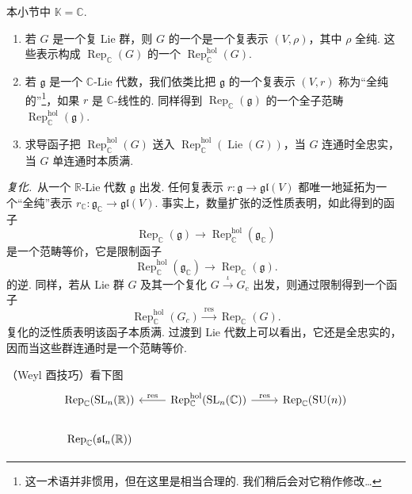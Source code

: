 \begin{numpara}\label{np:lie-1-12-3}
本小节中 $\mathbb K=\mathbb C$.
\begin{enumerate}[label=\roman*)]
\item 若 $G$ 是一个复 Lie 群，则 $G$ 的一个是一个复表示 $(V,\rho)$，其中 $\rho$ 全纯. 这些表示构成 $\operatorname{Rep}_{\mathbb C}(G)$ 的一个 $\operatorname{Rep}^{\mathrm{hol}}_{\mathbb C}(G)$.
\item 若 $\mathfrak g$ 是一个 $\mathbb C$-Lie 代数，我们依类比把 $\mathfrak g$ 的一个复表示 $(V,r)$ 称为``全纯的''\footnote{这一术语并非惯用，但在这里是相当合理的. 我们稍后会对它稍作修改\ldots}，如果 $r$ 是 $\mathbb C$-线性的. 同样得到 $\operatorname{Rep}_{\mathbb C}(\mathfrak g)$ 的一个全子范畴 $\operatorname{Rep}^{\mathrm{hol}}_{\mathbb C}(\mathfrak g)$.
\item 求导函子把 $\operatorname{Rep}^{\mathrm{hol}}_{\mathbb C}(G)$ 送入 $\operatorname{Rep}^{\mathrm{hol}}_{\mathbb C}(\operatorname{Lie}(G))$，当 $G$ 连通时全忠实，当 $G$ 单连通时本质满.
\end{enumerate}
\emph{复化.}\ 从一个 $\mathbb R$-Lie 代数 $\mathfrak g$ 出发. 任何复表示 $r:\mathfrak g\longrightarrow\mathfrak{gl}(V)$ 都唯一地延拓为一个``全纯''表示 $r_{\mathbb C}:\mathfrak g_{\mathbb C}\longrightarrow\mathfrak{gl}(V)$. 事实上，数量扩张的泛性质表明，如此得到的函子
\[
\operatorname{Rep}_{\mathbb C}(\mathfrak g)\longrightarrow\operatorname{Rep}^{\mathrm{hol}}_{\mathbb C}(\mathfrak g_{\mathbb C})
\]
是一个范畴等价，它是限制函子
\[
\operatorname{Rep}^{\mathrm{hol}}_{\mathbb C}(\mathfrak g_{\mathbb C})\longrightarrow\operatorname{Rep}_{\mathbb C}(\mathfrak g).
\]
的逆.
同样，若从 Lie 群 $G$ 及其一个复化 $G\xrightarrow{\ \iota\ }G_{c}$ 出发，则通过限制得到一个函子
\[
\operatorname{Rep}^{\mathrm{hol}}_{\mathbb C}(G_{c})\xrightarrow{\ \mathrm{res}\ }\operatorname{Rep}_{\mathbb C}(G).
\]
复化的泛性质表明该函子本质满. 过渡到 Lie 代数上可以看出，它还是全忠实的，因而当这些群连通时是一个范畴等价.
\begin{example*}
（Weyl 酉技巧）看下图
\[
\begin{tikzcd}
\operatorname{Rep}_{\mathbb C}(\mathrm{SL}_n(\mathbb R)) &
\operatorname{Rep}^{\mathrm{hol}}_{\mathbb C}(\mathrm{SL}_n(\mathbb C))
\ar[l,"\mathrm{res}"'] \ar[r,"\mathrm{res}"] &
\operatorname{Rep}_{\mathbb C}(\mathrm{SU}(n)) \\
\operatorname{Rep}_{\mathbb C}(\mathfrak{sl}_n(\mathbb R)) &

\end{tikzcd}\]
\end{example*}
\end{numpara}
